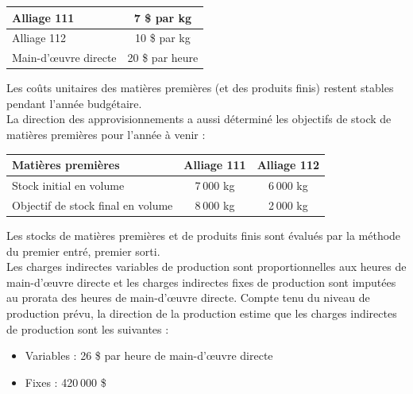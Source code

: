 \documentclass{kaobook}
\begin{document}
\begin{center}
\begin{tabular}{l c}
Alliage 111 & 7 \$ par kg\\
\hline
Alliage 112 & 10 \$ par kg\\
Main-d’œuvre directe & 20 \$ par heure\\
\end{tabular}
\end{center}
Les coûts unitaires des matières premières (et des produits finis) restent stables pendant l’année budgétaire.\\

La direction des approvisionnements a aussi déterminé les objectifs de stock de matières premières pour l'année à venir :\\

\begin{center}
\begin{tabular}{l c c}
Matières premières & Alliage 111 & Alliage 112\\
\hline
Stock initial en volume & 7 000 kg & 6 000 kg\\
Objectif de stock final en volume & 8 000 kg & 2 000 kg\\
\end{tabular}
\end{center}

Les stocks de matières premières et de produits finis sont évalués par la méthode du premier entré, premier sorti.\\

Les charges indirectes variables de production sont proportionnelles aux heures de main-d’œuvre directe et les charges indirectes fixes de production sont imputées au prorata des heures de main-d’œuvre directe. Compte tenu du niveau de production prévu, la direction de la production estime que les charges indirectes de production sont les suivantes :\\
\begin{itemize}
\item Variables : 26 \$ par heure de main-d’œuvre directe\\
\item Fixes : 420 000 \$\\
\end{itemize}
\end{document}
